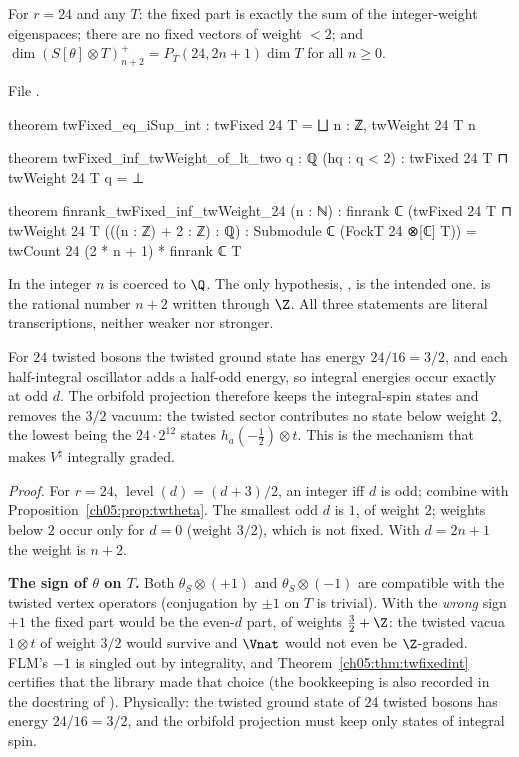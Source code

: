 \begin{theorem}[Rank $24$: fixed $=$ integral weight, nothing below $2$]\label{ch05:thm:twfixedint}
For $r = 24$ and any $T$: the fixed part is exactly the sum of the integer-weight eigenspaces; there
are no fixed vectors of weight $<2$; and $\dim(S[\theta]\otimes T)^+_{n+2} = P_T(24,2n+1)\dim T$ for all
$n\ge0$.
\end{theorem}
\noindent File .
\begin{leancode}
theorem twFixed_eq_iSup_int : twFixed 24 T = ⨆ n : ℤ, twWeight 24 T n

theorem twFixed_inf_twWeight_of_lt_two {q : ℚ} (hq : q < 2) :
    twFixed 24 T ⊓ twWeight 24 T q = ⊥

theorem finrank_twFixed_inf_twWeight_24 (n : ℕ) :
    finrank ℂ (twFixed 24 T ⊓ twWeight 24 T (((n : ℤ) + 2 : ℤ) : ℚ) :
        Submodule ℂ (FockT 24 ⊗[ℂ] T))
      = twCount 24 (2 * n + 1) * finrank ℂ T
\end{leancode}
\begin{dictionary}
In  the integer $n$ is coerced to $\Q$. The only hypothesis,
, is the intended one.  is the rational number $n+2$
written through $\Z$. All three statements are literal transcriptions, neither weaker nor stronger.
\end{dictionary}

\begin{physics}
For $24$ twisted bosons the twisted ground state has energy $24/16=3/2$, and each half-integral oscillator adds a half-odd energy, so integral energies occur exactly at odd $d$. The orbifold projection therefore keeps the integral-spin states and removes the $3/2$ vacuum: the twisted sector contributes no state below weight $2$, the lowest being the $24\cdot2^{12}$ states $h_a(-\tfrac12)\otimes t$. This is the mechanism that makes $V^\natural$ integrally graded.
\end{physics}
\noindent\emph{Proof.} For $r = 24$, $\operatorname{level}(d) = (d+3)/2$, an integer iff $d$ is odd; combine
with Proposition~\ref{ch05:prop:twtheta}. The smallest odd $d$ is $1$, of weight $2$; weights below $2$
occur only for $d = 0$ (weight $3/2$), which is not fixed. With $d = 2n+1$ the weight is $n+2$.

\begin{warning}
\textbf{The sign of $\theta$ on $T$.}
Both $\theta_S\otimes(+1)$ and $\theta_S\otimes(-1)$ are compatible with the twisted vertex operators
(conjugation by $\pm1$ on $T$ is trivial). With the \emph{wrong} sign $+1$ the fixed part would be the
even-$d$ part, of weights $\tfrac32+\Z$: the twisted vacua $1\otimes t$ of weight $3/2$ would survive and
$\Vnat$ would not even be $\Z$-graded. FLM's $-1$ is singled out by integrality, and
Theorem~\ref{ch05:thm:twfixedint} certifies that the library made that choice (the bookkeeping is also
recorded in the docstring of ). Physically: the twisted ground
state of $24$ twisted bosons has energy $24/16 = 3/2$, and the orbifold projection must keep only
states of integral spin.
\end{warning}

